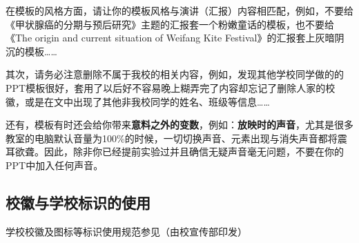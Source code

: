 在模板的风格方面，请让你的模板风格与演讲（汇报）内容相匹配，例如，不要给《甲状腺癌的分期与预后研究》主题的汇报套一个粉嫩童话的模板，也不要给《The origin and current situation of Weifang Kite Festival》的汇报套上灰暗阴沉的模板……

其次，请务必注意删除不属于我校的相关内容，例如，发现其他学校同学做的的PPT模板很好，套用了以后好不容易晚上糊弄完了内容却忘记了删除人家的校徽，或是在文中出现了其他非我校同学的姓名、班级等信息……

还有，模板有时还会给你带来\textbf{意料之外的变数}，例如：\textbf{放映时的声音}，尤其是很多教室的电脑默认音量为100\%的时候，一切切换声音、元素出现与消失声音都将震耳欲聋。因此，除非你已经提前实验过并且确信无疑声音毫无问题，不要在你的PPT中加入任何声音。

\subsection[校徽与学校标识的使用]{校徽与学校标识的使用}
学校校徽及图标等标识使用规范参见（由校宣传部印发）